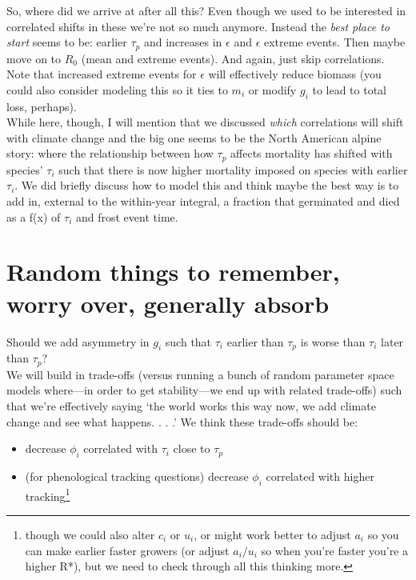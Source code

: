 \documentclass[11pt,a4paper,oneside]{article}
\begin{document}
So, where did we arrive at after all this? Even though we used to be interested in correlated shifts in these we're not so much anymore. Instead the \emph{best place to start} seems to be: earlier \(\tau_{p}\) and increases in \(\epsilon\) and \(\epsilon\) extreme events. Then maybe move on to \(R_{0}\) (mean and extreme events). And again, just skip correlations.\\

Note that increased extreme events for \(\epsilon\)  will effectively reduce biomass (you could also consider modeling this so it ties to \(m_{i}\) or modify \(g_{i}\) to lead to total loss, perhaps).\\

While here, though, I will mention that we discussed \emph{which} correlations will shift with climate change and the big one seems to be the North American alpine story: where the relationship between how \(\tau_{p}\) affects mortality has shifted with species' \(\tau_{i}\) such that there is now higher mortality imposed on species with earlier \(\tau_{i}\). We did briefly discuss how to model this and think maybe the best way is to add in, external to the within-year integral, a fraction that germinated and died as a f(x) of \(\tau_{i}\)  and frost event time.\\

\section{Random things to remember, worry over, generally absorb}

 Should we add asymmetry in \(g_{i}\) such that \(\tau_{i}\) earlier than \(\tau_{p}\) is worse than \(\tau_{i}\) later than \(\tau_{p}\)?\\

 We will build in trade-offs (versus running a bunch of random parameter space models where---in order to get stability---we end up with related trade-offs) such that we're effectively saying `the world works this way now, we add climate change and see what happens. . . .' We think these trade-offs should be:
\begin{itemize}
\item decrease \(\phi_{i}\) correlated with  \(\tau_{i}\) close to  \(\tau_{p}\)
\item (for phenological tracking questions) decrease \(\phi_{i}\) correlated with higher tracking\footnote{though we could also alter \(c_{i}\) or \(u_{i}\), or might work better to adjust \(a_{i}\) so you can make earlier faster growers (or adjust \(a_{i}/u_{i}\) so when you're faster you're a higher R*), but we need to check through all this thinking more.}
\end{itemize}
\end{document}
